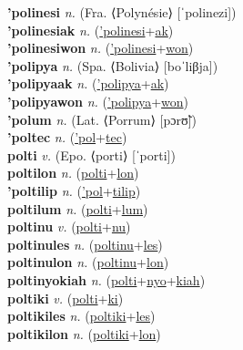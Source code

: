 \textbf{'polinesi} \textit{n.} (Fra. ⟨Polynésie⟩ [ˈpolinezi])
 \label{'polinesi} \\
\textbf{'polinesiak} \textit{n.} (\hyperref['polinesi]{'polinesi}+\hyperref[ak]{ak})
 \label{'polinesiak} \\
\textbf{'polinesiwon} \textit{n.} (\hyperref['polinesi]{'polinesi}+\hyperref[won]{won})
 \label{'polinesiwon} \\
\textbf{'polipya} \textit{n.} (Spa. ⟨Bolivia⟩ [boˈliβja])
 \label{'polipya} \\
\textbf{'polipyaak} \textit{n.} (\hyperref['polipya]{'polipya}+\hyperref[ak]{ak})
 \label{'polipyaak} \\
\textbf{'polipyawon} \textit{n.} (\hyperref['polipya]{'polipya}+\hyperref[won]{won})
 \label{'polipyawon} \\
\textbf{'polum} \textit{n.} (Lat. ⟨Porrum⟩ [pɔrʊ̃])
 \label{'polum} \\
\textbf{'poltec} \textit{n.} (\hyperref['pol]{'pol}+\hyperref[tec]{tec})
 \label{'poltec} \\
\textbf{polti} \textit{v.} (Epo. ⟨porti⟩ [ˈporti])
 \label{polti} \\
\textbf{poltilon} \textit{n.} (\hyperref[polti]{polti}+\hyperref[lon]{lon})
 \label{poltilon} \\
\textbf{'poltilip} \textit{n.} (\hyperref['pol]{'pol}+\hyperref[tilip]{tilip})
 \label{'poltilip} \\
\textbf{poltilum} \textit{n.} (\hyperref[polti]{polti}+\hyperref[lum]{lum})
 \label{poltilum} \\
\textbf{poltinu} \textit{v.} (\hyperref[polti]{polti}+\hyperref[nu]{nu})
 \label{poltinu} \\
\textbf{poltinules} \textit{n.} (\hyperref[poltinu]{poltinu}+\hyperref[les]{les})
 \label{poltinules} \\
\textbf{poltinulon} \textit{n.} (\hyperref[poltinu]{poltinu}+\hyperref[lon]{lon})
 \label{poltinulon} \\
\textbf{poltinyokiah} \textit{n.} (\hyperref[polti]{polti}+\hyperref[nyo]{nyo}+\hyperref[kiah]{kiah})
 \label{poltinyokiah} \\
\textbf{poltiki} \textit{v.} (\hyperref[polti]{polti}+\hyperref[ki]{ki})
 \label{poltiki} \\
\textbf{poltikiles} \textit{n.} (\hyperref[poltiki]{poltiki}+\hyperref[les]{les})
 \label{poltikiles} \\
\textbf{poltikilon} \textit{n.} (\hyperref[poltiki]{poltiki}+\hyperref[lon]{lon})
 \label{poltikilon} \\
